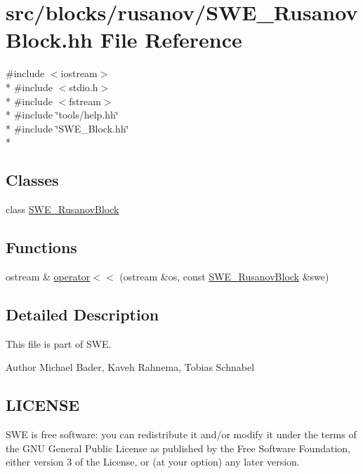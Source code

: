 \hypertarget{SWE__RusanovBlock_8hh}{\section{src/blocks/rusanov/\-S\-W\-E\-\_\-\-Rusanov\-Block.hh File Reference}
\label{SWE__RusanovBlock_8hh}
}
{\ttfamily \#include $<$iostream$>$}\\*
{\ttfamily \#include $<$stdio.\-h$>$}\\*
{\ttfamily \#include $<$fstream$>$}\\*
{\ttfamily \#include \char`\"{}tools/help.\-hh\char`\"{}}\\*
{\ttfamily \#include \char`\"{}S\-W\-E\-\_\-\-Block.\-hh\char`\"{}}\\*
\subsection*{Classes}
\begin{DoxyCompactItemize}
\item 
class \hyperlink{classSWE__RusanovBlock}{S\-W\-E\-\_\-\-Rusanov\-Block}
\end{DoxyCompactItemize}
\subsection*{Functions}
\begin{DoxyCompactItemize}
\item 
ostream \& \hyperlink{SWE__RusanovBlock_8hh_a11f96afabd5e590e50d491568b96503a}{operator$<$$<$} (ostream \&os, const \hyperlink{classSWE__RusanovBlock}{S\-W\-E\-\_\-\-Rusanov\-Block} \&swe)
\end{DoxyCompactItemize}


\subsection{Detailed Description}
This file is part of S\-W\-E.

\begin{DoxyAuthor}{Author}
Michael Bader, Kaveh Rahnema, Tobias Schnabel
\end{DoxyAuthor}
\hypertarget{Writer_8hh_LICENSE}{}\subsection{L\-I\-C\-E\-N\-S\-E}\label{Writer_8hh_LICENSE}
S\-W\-E is free software\-: you can redistribute it and/or modify it under the terms of the G\-N\-U General Public License as published by the Free Software Foundation, either version 3 of the License, or (at your option) any later version.

